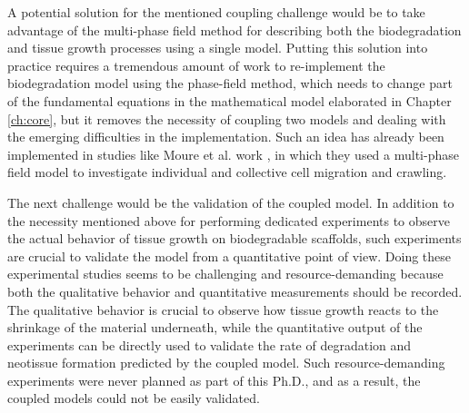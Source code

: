 A potential solution for the mentioned coupling challenge would be to take advantage of the multi-phase field method for describing both the biodegradation and tissue growth processes using a single model. Putting this solution into practice requires a tremendous amount of work to re-implement the biodegradation model using the phase-field method, which needs to change part of the fundamental equations in the mathematical model elaborated in Chapter \ref{ch:core}, but it removes the necessity of coupling two models and dealing with the emerging difficulties in the implementation. Such an idea has already been implemented in studies like Moure et al. work \cite{Moure2019,Moure2017Thesis}, in which they used a multi-phase field model to investigate individual and collective cell migration and crawling.


The next challenge would be the validation of the coupled model. In addition to the necessity mentioned above for performing dedicated experiments to observe the actual behavior of tissue growth on biodegradable scaffolds, such experiments are crucial to validate the model from a quantitative point of view. Doing these experimental studies seems to be challenging and resource-demanding because both the qualitative behavior and quantitative measurements should be recorded. The qualitative behavior is crucial to observe how tissue growth reacts to the shrinkage of the material underneath, while the quantitative output of the experiments can be directly used to validate the rate of degradation and neotissue formation predicted by the coupled model. Such resource-demanding experiments were never planned as part of this Ph.D., and as a result, the coupled models could not be easily validated.


